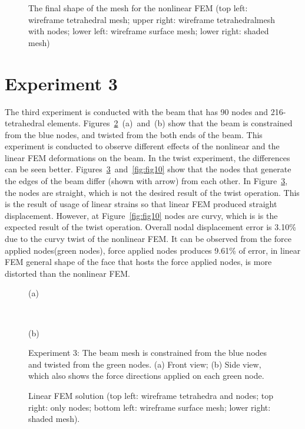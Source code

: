 \begin{figure}[h]
\centerline{}
\caption{The final shape of the mesh for the nonlinear FEM (top left: wireframe tetrahedral mesh; upper right: wireframe tetrahedralmesh with nodes; lower left: wireframe surface mesh; lower right: shaded mesh)}
\label{fig:fig6}
\end{figure}

\clearpage
\section{Experiment 3}
\label{iii}

The third experiment is conducted with the beam that has 90 nodes and 216-tetrahedral elements. Figures~\ref{fig:fig78}~(a)~and~(b) show that the beam is constrained from the blue nodes, and twisted from the both ends of the beam. This experiment is conducted to observe different effects of the nonlinear and the linear FEM deformations on the beam. In the twist experiment, the differences can be seen better. Figures~\ref{fig:fig9}~and~\ref{fig:fig10} show that the nodes that generate the edges of the beam differ (shown with arrow) from each other. In Figure~\ref{fig:fig9}, the nodes are straight, which is not the desired result of the twist operation. This is the result of usage of linear strains so that linear FEM produced straight displacement. However, at Figure~\ref{fig:fig10} nodes are curvy, which is is the expected result of the twist operation. Overall nodal displacement error is 3.10\% due to the curvy twist of the nonlinear FEM. It can be observed from the force applied nodes(green nodes), force applied nodes produces 9.61\% of error, in linear FEM general shape of the face that hosts the force applied nodes, is more distorted than the nonlinear FEM.

\begin{figure}[h]
\centerline{}
\centerline{(a)}
\centerline{\ }
\centerline{}
\centerline{(b)}
\caption{Experiment 3: The beam mesh is constrained from the blue nodes and twisted from the green nodes. (a) Front view; (b) Side view, which also shows the force directions applied on each green node.}
\label{fig:fig78}
\end{figure}

\begin{figure}[c]
\centerline{}
\caption{Linear FEM solution (top left: wireframe tetrahedra and nodes; top right: only nodes; bottom left: wireframe surface mesh; lower right: shaded mesh).}
\label{fig:fig9}
\end{figure}

